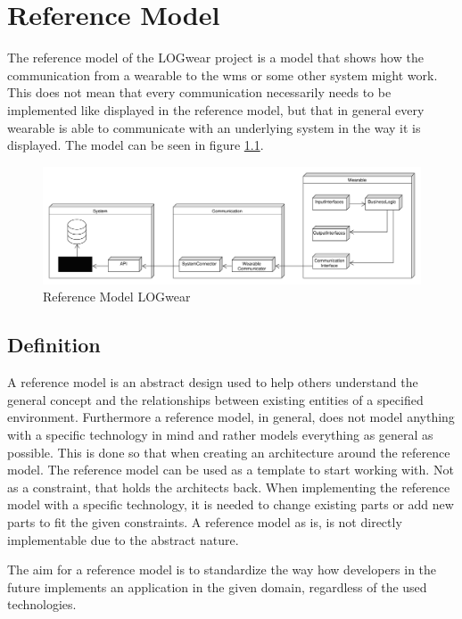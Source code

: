 \chapter{Reference Model}\label{cha:reference}
The \gls{reference model} of the LOGwear project is a model that shows how the communication from a wearable to the \gls{wms} or some other system might work. This does not mean that every communication necessarily needs to be implemented like displayed in the \gls{reference model}, but that in general every wearable is able to communicate with an underlying system in the way it is displayed.
The model can be seen in figure \ref{fig:referenceModel}.
\begin{figure}[htbp]
	\includegraphics[width=\linewidth]{images/PackageModel_ReferenceArchitecture}
	\caption{Reference Model LOGwear}
	\label{fig:referenceModel}
\end{figure}

\section{Definition}
A \gls{reference model} is an abstract design used to help others understand the general concept and the relationships between existing entities of a specified environment. Furthermore a \gls{reference model}, in general, does not model anything with a specific technology in mind and rather models everything as general as possible. This is done so that when creating an architecture around the \gls{reference model}. The \gls{reference model} can be used as a template to start working with. Not as a constraint, that holds the architects back. When implementing the \gls{reference model} with a specific technology, it is needed to change existing parts or add new parts to fit the given constraints. A \gls{reference model} as is, is not directly implementable due to the abstract nature.

The aim for a \gls{reference model} is to standardize the way how developers in the future implements an application in the given domain, regardless of the used technologies.\citep{website:oasis-rm}

